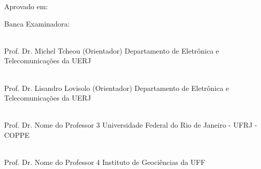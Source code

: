 \addtocounter{page}{+1}
\begin{center}

\setNomeAluno

\vspace{1cm}

\textbf{\setTitulo}

\end{center}

\vspace{.4cm}

\begin{flushright}
\parbox{8cm}{
}
\end{flushright}

\vspace{.6cm}



\noindent Aprovado em: \setApprovalDate

\noindent Banca Examinadora:


%
%
%
%



\vspace{.7cm}

\begin{flushright}
\parbox{12cm}{

\singlespacing

\hrulefill \\

\vspace{-.4cm}
Prof. Dr. Michel Tcheou (Orientador)
\newline
Departamento de Eletrônica e Telecomunicações  da UERJ
\vspace{.7cm}

\hrulefill \\

\vspace{-.4cm}
Prof. Dr. Lisandro Lovisolo (Orientador)
\newline
Departamento de Eletrônica e Telecomunicações  da UERJ
\vspace{.7cm}


\hrulefill \\

\vspace{-.4cm}
Prof. Dr. Nome do Professor 3
\newline
Universidade Federal do Rio de Janeiro - UFRJ - COPPE
\vspace{.7cm}

\hrulefill \\

\vspace{-.4cm}
Prof. Dr. Nome do Professor 4
\newline
Instituto de Geociências da UFF
\vspace{.7cm}
}
\end{flushright}
\vfill

\begin{center}
\setLocationDate
\end{center}
